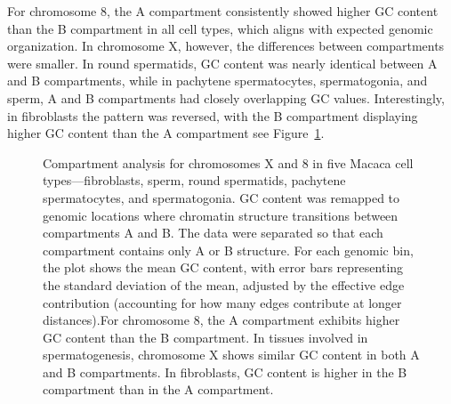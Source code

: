 \documentclass[
  a4paper,
]{scrbook}
\begin{document}
For chromosome 8, the A compartment consistently showed higher GC
content than the B compartment in all cell types, which aligns with
expected genomic organization. In chromosome X, however, the differences
between compartments were smaller. In round spermatids, GC content was
nearly identical between A and B compartments, while in pachytene
spermatocytes, spermatogonia, and sperm, A and B compartments had
closely overlapping GC values. Interestingly, in fibroblasts the pattern
was reversed, with the B compartment displaying higher GC content than
the A compartment see Figure~\ref{fig-GC}.

\begin{figure}


\caption{\label{fig-GC}Compartment analysis for chromosomes X and 8 in
five Macaca cell types---fibroblasts, sperm, round spermatids, pachytene
spermatocytes, and spermatogonia. GC content was remapped to genomic
locations where chromatin structure transitions between compartments A
and B. The data were separated so that each compartment contains only A
or B structure. For each genomic bin, the plot shows the mean GC
content, with error bars representing the standard deviation of the
mean, adjusted by the effective edge contribution (accounting for how
many edges contribute at longer distances).For chromosome 8, the A
compartment exhibits higher GC content than the B compartment. In
tissues involved in spermatogenesis, chromosome X shows similar GC
content in both A and B compartments. In fibroblasts, GC content is
higher in the B compartment than in the A compartment.}

\end{figure}%
\end{document}
